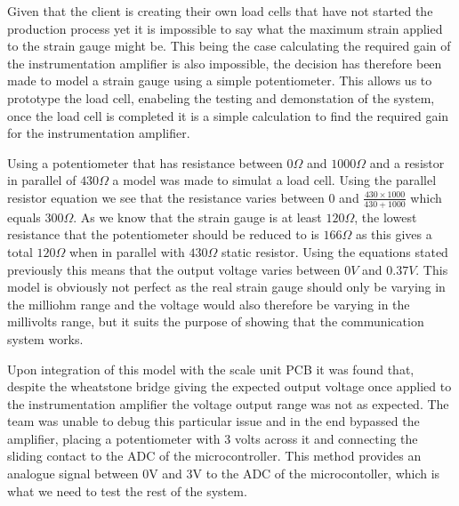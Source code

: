 Given that the client is creating their own load cells that have not started the production process yet it is impossible to say what the maximum strain applied to the strain gauge might be. This being the case calculating the required gain of the instrumentation amplifier is also impossible, the decision has therefore been made to model a strain gauge using a simple potentiometer. This allows us to prototype the load cell, enabeling the testing and demonstation of the system, once the load cell is completed it is a simple calculation to find the required gain for the instrumentation amplifier. 

Using a potentiometer that has resistance between $0\Omega$ and $1000\Omega$ and a resistor in parallel of $430\Omega$ a model was made to simulat a load cell. Using the parallel resistor equation we see that the resistance varies between $0$ and $\frac{430 \times 1000}{430 + 1000}$  which equals $300\Omega$. As we know that the strain gauge is at least $120\Omega$, the lowest resistance that the potentiometer should be reduced to is $166\Omega$ as this gives a total $120\Omega$ when in parallel with $430\Omega$ static resistor. Using the equations stated previously this means that the output voltage varies between $0V$ and $0.37V$. This model is obviously not perfect as the real strain gauge should only be varying in the milliohm range and the voltage would also therefore be varying in the millivolts range, but it suits the purpose of showing that the communication system works. 

Upon integration of this model with the scale unit PCB it was found that, despite the wheatstone bridge giving the expected output voltage once applied to the instrumentation amplifier the voltage output range was not as expected. The team was unable to debug this particular issue and in the end bypassed the amplifier, placing a potentiometer with 3 volts across it and connecting the sliding contact to the ADC of the microcontroller. This method provides an analogue signal between $0$V and $3$V to the ADC of the microcontoller, which is what we need to test the rest of the system. 
